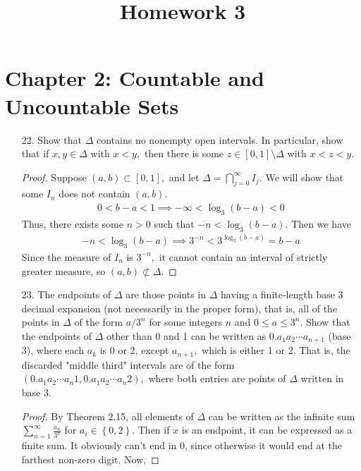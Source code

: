 \documentclass{article}
\begin{document}
\title{Homework 3}
\maketitle
\thispagestyle{fancy}

\section*{Chapter 2: Countable and Uncountable Sets}

\begin{itemize}
	\item[22.] Show that $\Delta$ contains no nonempty open intervals. In particular, show that if $x, y\in \Delta$ with $x<y,$ then there is some $z\in[0, 1]\setminus \Delta$ with $x<z<y.$
		\begin{proof}
			Suppose $(a, b)\subset [0, 1],$ and let $\Delta=\bigcap_{j=0}^\infty I_j.$ We will show that some $I_n$ does not contain $(a, b).$
			\begin{align*}
				0 < b-a <1 \implies -\infty<\log_3(b-a)<0
			\end{align*}
			Thus, there exists some $n>0$ such that $-n<\log_3(b-a).$ Then we have
			\begin{align*}
				-n<\log_3(b-a)\implies 3^{-n}<3^{\log_3(b-a)} = b-a
			\end{align*}
			Since the measure of $I_n$ is $3^{-n},$ it cannot contain an interval of strictly greater measure, so $(a, b)\not\subset \Delta.$
		\end{proof}

	\item[23.] The endpoints of $\Delta$ are those points in $\Delta$ having a finite-length base 3 decimal expansion (not necessarily in the proper form), that is, all of the points in $\Delta$ of the form $a/3^n$ for some integers $n$ and $0\le a\le 3^n.$ Show that the endpoints of $\Delta$ other than 0 and 1 can be written as $0.a_1a_2\cdots a_{n+1}$ (base 3), where each $a_k$ is 0 or 2, except $a_{n+1},$ which is either 1 or 2. That is, the discarded "middle third" intervals are of the form $(0.a_1a_2\cdots a_n1, 0.a_1a_2\cdots a_n2),$ where both entries are points of $\Delta$ written in base 3.
		\begin{proof}
			By Theorem 2.15, all elements of $\Delta$ can be written as the infinite sum $\sum_{n=1}^{\infty} \frac{a_n}{3^n}$ for $a_i\in\left\{ 0, 2 \right\}.$ Then if $x$ is an endpoint, it can be expressed as a finite sum. It obviously can't end in 0, since otherwise it would end at the farthest non-zero digit. Now,
			

\end{proof}
\end{itemize}
\end{document}
